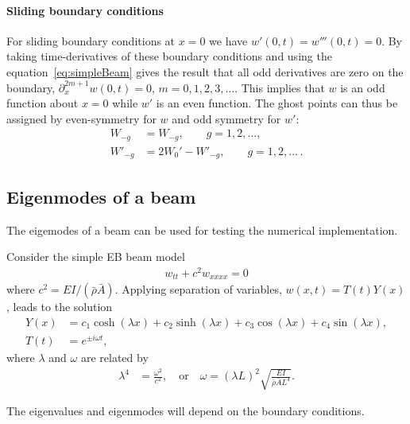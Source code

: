 \documentclass[11pt]{article}
\newcommand{\rhos}{\bar{\rho}}
\newcommand{\As}{\bar{A}}
\begin{document}
\paragraph{Sliding boundary conditions}
For sliding boundary conditions at $x=0$ we have $w'(0,t)=w'''(0,t)=0$. 
By taking time-derivatives of these boundary conditions and using the equation~\eqref{eq:simpleBeam}
gives the result that all odd derivatives are zero on the boundary, $\partial_x^{2m+1} w(0,t)=0$, $m=0,1,2,3,\ldots$.
This implies that $w$ is an odd function about $x=0$ while $w'$ is an even function.
The ghost points can thus be assigned by even-symmetry for $w$ and odd symmetry for $w'$:
\begin{align}
  W_{-g} &= W_{-g}, \qquad g=1,2,\ldots , \\
  W'_{-g} &= 2 W_0' - W'_{-g}, \qquad g=1,2,\ldots \,.
\end{align}



\clearpage
\subsection{Eigenmodes of a beam} \label{eq:BeamModel_Eigenmodes}

The eigemodes of a beam can be used for testing the numerical implementation.

Consider the simple EB beam model 
\begin{align*}
    w_{tt} + c^2 w_{xxxx} = 0
\end{align*}
where $c^2= E I/(\rhos\As)$. 
Applying separation of variables, $w(x,t) = T(t) Y(x)$, leads to the solution
\begin{align*}
    Y(x) &= c_1 \cosh(\lambda x) + c_2\sinh(\lambda x) + c_3 \cos(\lambda x) + c_4 \sin(\lambda x), \\
    T(t) &= e^{\pm i \omega t},
\end{align*}
where $\lambda$ and $\omega$ are related by
\begin{align*}
    \lambda^4 &= \frac{\omega^2}{c^2}, \quad\text{or}\quad \omega = (\lambda L)^2\sqrt{ \frac{E I}{\rhos\As L^4}}. 
\end{align*}

The eigenvalues and eigenmodes will depend on the boundary conditions.
\end{document}
